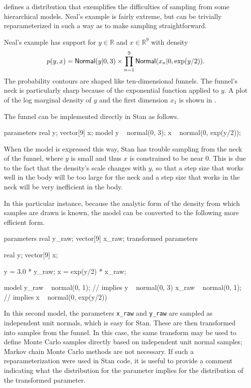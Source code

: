 \citep{Neal:2003} defines a distribution that exemplifies the
difficulties of sampling from some hierarchical models.  Neal's
example is fairly extreme, but can be trivially reparameterized in
such a way as to make sampling straightforward.

Neal's example has support for $y \in
\mathbb{R}$ and  $x \in \mathbb{R}^9$ with density
%
\[
p(y,x) = \distro{Normal}(y|0,3) \times \prod_{n=1}^9
\distro{Normal}(x_n|0,\exp(y/2)).
\]
%
The probability contours are shaped like ten-dimensional funnels.  The
funnel's neck is particularly sharp because of the exponential
function applied to $y$.  A plot of the log marginal density of $y$
and the first dimension $x_1$ is shown in .

The funnel can be implemented directly in Stan as follows.
%
\begin{stancode}
parameters {  
  real y;
  vector[9] x;
}
model {
  y ~ normal(0, 3);
  x ~ normal(0, exp(y/2));
}
\end{stancode}
%
When the model is expressed this way, Stan has trouble sampling from
the neck of the funnel, where $y$ is small and thus $x$ is constrained
to be near 0.  This is due to the fact that the density's scale
changes with $y$, so that a step size that works well in the body will
be too large for the neck and a step size that works in the neck will be
very inefficient in the body.

In this particular instance, because the analytic form of the density
from which samples are drawn is known, the model can be converted to
the following more efficient form.
%
\begin{stancode}
parameters {  
  real y_raw;
  vector[9] x_raw;
}
transformed parameters {
  real y;
  vector[9] x;

  y = 3.0 * y_raw;  
  x = exp(y/2) * x_raw;
}
model {
  y_raw ~ normal(0, 1); // implies y ~ normal(0, 3) 
  x_raw ~ normal(0, 1); // implies x ~ normal(0, exp(y/2))  
}
\end{stancode}
%
In this second model, the parameters \Verb|x_raw| and \Verb|y_raw| are
sampled as independent unit normals, which is easy for Stan.  These
are then transformed into samples from the funnel.  In this case, the
same transform may be used to define Monte Carlo samples directly
based on independent unit normal samples; Markov chain Monte Carlo
methods are not necessary. If such a reparameterization were used in
Stan code, it is useful to provide a comment indicating what the
distribution for the parameter implies for the distribution of the
transformed parameter.

